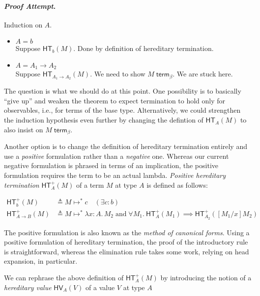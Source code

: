 \documentclass{article}
\newenvironment{proofattempt}{\paragraph{\emph{Proof Attempt}.}}{\hfill\color{red}{X}\par}
\newcommand{\hterm}[2]{\ensuremath{\mathsf{HT}_{#1}(#2)}}
\newcommand{\htermp}[2]{\ensuremath{\mathsf{HT}^+_{#1}(#2)}}
\newcommand{\termb}[1]{\ensuremath{{#1} \; \mathsf{term}_{\beta}}}
\newcommand{\hv}[2]{\ensuremath{\mathsf{HV}_{#1}(#2)}}
\newcommand{\steps}[2]{\ensuremath{#1 \mapsto^* #2}}
\newcommand{\fn}[2]{\ensuremath{#1 \to #2}}
\newcommand{\lam}[3]{\ensuremath{\lambda #1 {:} #2.\, #3}}
\begin{document}
\begin{proofattempt}
  Induction on $A$.
   \begin{itemize}
  \setlength\itemsep{1em}
  \item $A = b$\\
    Suppose $\hterm{b}{M}$. Done by definition of hereditary termination.  
  \item $A = \fn{A_1}{A_2}$\\
    Suppose $\hterm{\fn{A_1}{A_2}}{M}$. We need to show $\termb{M}$. We are stuck here.
  \end{itemize}
\end{proofattempt}

The question is what we should do at this point.  One possibility is to basically ``give up''
and weaken the theorem to expect termination to hold only for observables, i.e., for terms of
the base type.  Alternatively, we could strengthen the induction hypothesis even further by
changing the defintion of $\hterm{A}{M}$ to also insist on $\termb{M}$.

Another option is to change the definition of hereditary termination entirely and use a
\emph{positive} formulation rather than a \emph{negative} one.  Whereas our current negative
formulation is phrased in terms of an implication, the positive formulation requires the term
to be an actual lambda.  \emph{Positive hereditary termination} $\htermp{A}{M}$ of a term $M$ at type
$A$ is defined as follows:


\begin{align*}
  \htermp{b}{M} &\triangleq \steps{M}{c} \quad (\exists c : b)\\
  \htermp{\fn{A}{B}}{M} &\triangleq \steps{M}{\lam{x}{A}{M_2}} \; \text{and}\;
  \forall M_1.\ \htermp{A}{M_1} \implies \htermp{A_2}{[M_1/x]M_2}
\end{align*}

The positive formulation is also known as the \emph{method of canonical forms}.  Using a
positive formulation of hereditary termination, the proof of the introductory rule is
straightforward, whereas the elimination rule takes some work, relying on head expansion, in
particular.

We can rephrase the above definition of $\htermp{A}{M}$ by introducing the notion of a
\emph{hereditary value} $\hv{A}{V}$ of a value $V$ at type $A$
\end{document}
